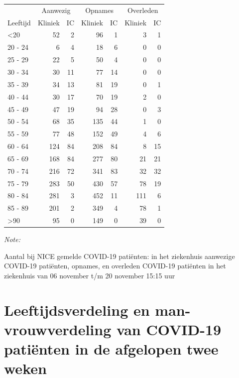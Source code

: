 \documentclass[
  english,
  man,floatsintext]{apa6}
\begin{document}
\begin{table}
\centering\begingroup\fontsize{10}{12}\selectfont

\begin{threeparttable}
\begin{tabular}{lrrrrrr}
\toprule
\multicolumn{1}{c}{ } & \multicolumn{2}{c}{Aanwezig} & \multicolumn{2}{c}{Opnames} & \multicolumn{2}{c}{Overleden} \\
\cmidrule(l{3pt}r{3pt}){2-3} \cmidrule(l{3pt}r{3pt}){4-5} \cmidrule(l{3pt}r{3pt}){6-7}
Leeftijd & Kliniek & IC & Kliniek & IC & Kliniek & IC\\
\midrule
<20 & 52 & 2 & 96 & 1 & 3 & 1\\
20 - 24 & 6 & 4 & 18 & 6 & 0 & 0\\
25 - 29 & 22 & 5 & 50 & 4 & 0 & 0\\
30 - 34 & 30 & 11 & 77 & 14 & 0 & 0\\
35 - 39 & 34 & 13 & 81 & 19 & 0 & 1\\
40 - 44 & 30 & 17 & 70 & 19 & 2 & 0\\
45 - 49 & 47 & 19 & 94 & 28 & 0 & 3\\
50 - 54 & 68 & 35 & 135 & 44 & 1 & 0\\
55 - 59 & 77 & 48 & 152 & 49 & 4 & 6\\
60 - 64 & 124 & 84 & 208 & 84 & 8 & 15\\
65 - 69 & 168 & 84 & 277 & 80 & 21 & 21\\
70 - 74 & 216 & 72 & 341 & 83 & 32 & 32\\
75 - 79 & 283 & 50 & 430 & 57 & 78 & 19\\
80 - 84 & 281 & 3 & 452 & 11 & 111 & 6\\
85 - 89 & 201 & 2 & 349 & 4 & 78 & 1\\
>90 & 95 & 0 & 149 & 0 & 39 & 0\\
\bottomrule
\end{tabular}
\begin{tablenotes}
\item \textit{Note: } 
\item Aantal bij NICE gemelde COVID-19 patiënten: in het ziekenhuis aanwezige COVID-19 patiënten, opnames, en overleden COVID-19 patiënten in het ziekenhuis van 06 november t/m 20 november 15:15 uur
\end{tablenotes}
\end{threeparttable}
\endgroup{}
\end{table}

\newpage

\hypertarget{leeftijdsverdeling-en-man-vrouwverdeling-van-covid-19-patiuxebnten-in-de-afgelopen-twee-weken}{%
\section{Leeftijdsverdeling en man-vrouwverdeling van COVID-19 patiënten in de afgelopen twee weken}\label{leeftijdsverdeling-en-man-vrouwverdeling-van-covid-19-patiuxebnten-in-de-afgelopen-twee-weken}}
\end{document}
